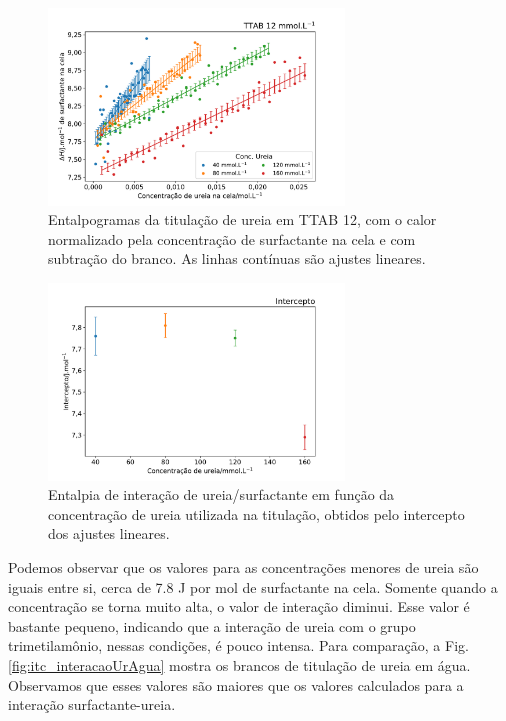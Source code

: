 \begin{figure}[H]
	\centering
	\includegraphics[width=0.7\textwidth]{imagens/itc/interacao_ureia_surf}
	\caption{Entalpogramas da titulação de ureia em TTAB 12\mM, com o calor normalizado pela concentração de surfactante na cela e com subtração do branco. As linhas contínuas são ajustes lineares.}
	\label{fig:itc_interacaoUrSurf_entalpograma}
\end{figure}


\begin{figure}[H]
	\centering
	\includegraphics[width=0.7\textwidth]{imagens/itc/interacao_intercepto}
	\caption{Entalpia de interação de ureia/surfactante em função da concentração de ureia utilizada na titulação, obtidos pelo intercepto dos ajustes lineares.}
	\label{fig:itc_interacaoUrSurf_intercepto}
\end{figure}

	Podemos observar que os valores para as concentrações menores de ureia são iguais entre si, cerca de 7.8 J por mol de surfactante na cela. Somente quando a concentração se torna muito alta, o valor de interação diminui. Esse valor é bastante pequeno, indicando que a interação de ureia com o grupo trimetilamônio, nessas condições, é pouco intensa. Para comparação, a Fig. \ref{fig:itc_interacaoUrAgua} mostra os brancos de titulação de ureia em água. Observamos que esses valores são maiores que os valores calculados para a interação surfactante-ureia.
	
